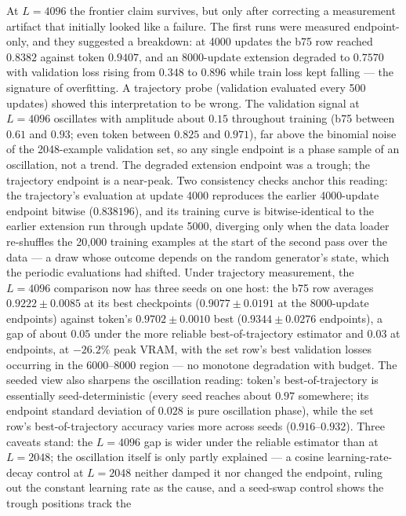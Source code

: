 \documentclass{article}
\theoremstyle{plain}
\theoremstyle{definition}
\theoremstyle{remark}
\begin{document}
At $L=4096$ the frontier claim survives, but only after correcting a
measurement artifact that initially looked like a failure.  The first runs
were measured endpoint-only, and they suggested a breakdown: at 4000 updates
the b75 row reached
$0.8382$ against token $0.9407$, and an 8000-update extension degraded to
$0.7570$ with validation loss rising from $0.348$ to $0.896$ while train
loss kept falling --- the signature of overfitting.  A trajectory probe
(validation evaluated every 500 updates) showed this interpretation to be
wrong.  The
validation signal at $L=4096$ oscillates with amplitude about $0.15$
throughout training (b75 between $0.61$ and $0.93$; even token between
$0.825$ and $0.971$), far above the binomial noise of the 2048-example
validation set, so any single endpoint is a phase sample of an oscillation,
not a trend.  The degraded extension endpoint was a trough; the trajectory
endpoint is a near-peak.  Two consistency checks anchor this reading: the
trajectory's evaluation at update 4000 reproduces the earlier 4000-update
endpoint bitwise ($0.838196$), and its training curve is bitwise-identical
to the earlier extension run through update 5000, diverging only when the
data loader re-shuffles the 20{,}000 training examples at the start of the
second pass over the data --- a draw whose outcome depends on the random
generator's state, which the periodic evaluations had shifted.  Under
trajectory measurement, the $L=4096$ comparison now has three seeds on
one host: the b75 row averages
$0.9222\pm0.0085$ at its best checkpoints ($0.9077\pm0.0191$ at the
8000-update endpoints) against token's $0.9702\pm0.0010$ best
($0.9344\pm0.0276$ endpoints), a gap of about $0.05$ under the more reliable
best-of-trajectory estimator and $0.03$ at endpoints, at
$-26.2$\% peak VRAM, with the set row's best validation losses occurring in
the 6000--8000 region --- no monotone degradation with budget.  The seeded
view also sharpens the oscillation reading: token's best-of-trajectory is
essentially seed-deterministic (every seed reaches about $0.97$ somewhere;
its endpoint standard deviation of $0.028$ is pure oscillation phase), while
the set row's best-of-trajectory accuracy varies more across seeds
($0.916$--$0.932$).  Three
caveats stand: the $L=4096$ gap is wider under the reliable estimator than
at $L=2048$; the oscillation itself is only partly explained --- a cosine
learning-rate-decay control at $L=2048$ neither
damped it nor changed the endpoint, ruling out the constant learning rate as
the cause, and a seed-swap control shows the trough positions track the
\end{document}
